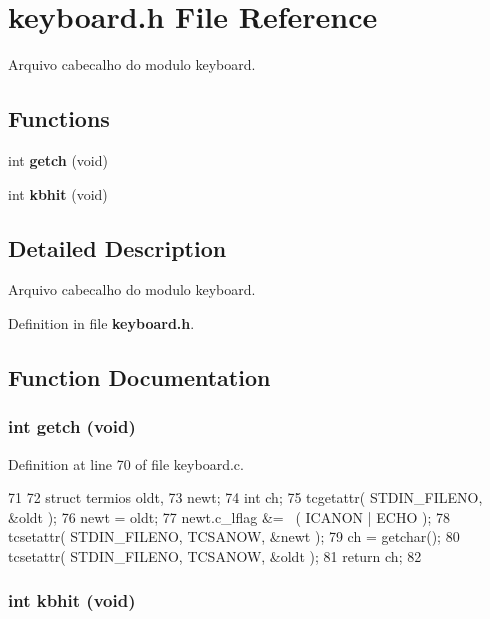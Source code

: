 \section{keyboard.h File Reference}
\label{keyboard_8h}


Arquivo cabecalho do modulo keyboard.  
\subsection*{Functions}
\begin{DoxyCompactItemize}
\item 
int {\bf getch} (void)
\item 
int {\bf kbhit} (void)
\end{DoxyCompactItemize}


\subsection{Detailed Description}
Arquivo cabecalho do modulo keyboard. 

Definition in file {\bf keyboard.h}.

\subsection{Function Documentation}
\subsubsection[{getch}]{\setlength{\rightskip}{0pt plus 5cm}int getch (void)}\label{keyboard_8h_af5978fab9fa6dd4ced1c3a8ab1251f7b}


Definition at line 70 of file keyboard.c.


\begin{DoxyCode}
71 {
72         struct termios oldt,
73         newt;
74         int ch;
75         tcgetattr( STDIN_FILENO, &oldt );
76         newt = oldt;
77         newt.c_lflag &= ~( ICANON | ECHO );
78         tcsetattr( STDIN_FILENO, TCSANOW, &newt );
79         ch = getchar();
80         tcsetattr( STDIN_FILENO, TCSANOW, &oldt );
81         return ch;
82 }
\end{DoxyCode}
\subsubsection[{kbhit}]{\setlength{\rightskip}{0pt plus 5cm}int kbhit (void)}\label{keyboard_8h_a97e9b1fe8d4c010474637a654aad6566}


